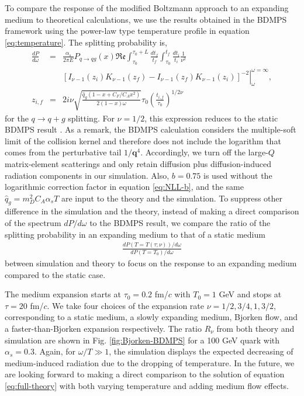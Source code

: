 \documentclass[aps, prc, reprint, amsmath, groupedaddress, nofootinbib]{revtex4-1}
\begin{document}
To compare the response of the modified Boltzmann approach to an expanding medium to theoretical calculations, we use the results obtained in the BDMPS framework \cite{Baier:1998yf} using the power-law type temperature profile in equation \ref{eq:temperature}. 
The splitting probability is,
\begin{eqnarray}
\frac{dP}{d\omega} &=& \frac{\alpha_s}{2\pi E}P_{q\rightarrow qg}(x)\mathfrak{Re}\int_{\tau_0}^{\tau_0+L}\frac{dt_f}{t_f}\int_{\tau_0}^{t_f}\frac{dt_i}{t_i} \frac{1}{\nu^2}\\
\nonumber
&& \left.\left[ I_{\nu-1}(z_i)K_{\nu-1}(z_f)-I_{\nu-1}(z_f)K_{\nu-1}(z_i)\right]^{-2}\right|_{\omega}^{\omega=\infty},\\
z_{i,f} &=& 2i\nu \sqrt{\frac{\hat{q}_g(1-x+C_F/C_A x^2)}{2(1-x)\omega}} \tau_0 \left( \frac{t_{i,f}}{\tau_0}\right) ^{1/2\nu}
\end{eqnarray}
for the $q\rightarrow q+g$ splitting.
For $\nu=1/2$, this expression reduces to the static BDMPS result \cite{Baier:1996kr}. 
As a remark, the BDMPS calculation considers the multiple-soft limit of the collision kernel and therefore does not include the logarithm that comes from the perturbative tail $1/\mathbf{q}^4$. 
Accordingly, we turn off the large-$Q$ matrix-element scatterings and only retain diffusion plus diffusion-induced radiation components in our simulation.
Also, $b=0.75$ is used without the logarithmic correction factor in equation \ref{eq:NLL-b}, and the same $\hat{q}_g = m_D^2 C_A\alpha_s T$ are input to the theory and the simulation.
To suppress other difference in the simulation and the theory, instead of making a direct comparison of the spectrum $dP/d\omega$ to the BDMPS result, we compare the ratio of the splitting probability in an expanding medium to that of a static medium
\begin{eqnarray}
\frac{dP(T=T(\tau;\nu))/d\omega}{dP(T=T_0)/d\omega}
\end{eqnarray}
between simulation and theory to focus on the response to an expanding medium compared to the static case.

The medium expansion starts at $\tau_0=0.2$ fm/$c$ with $T_0=1$ GeV and stops at $\tau = 20$ fm/$c$.
We take four choices of the expansion rate $\nu = 1/2, 3/4, 1, 3/2$, corresponding to a static medium, a slowly expanding medium, Bjorken flow, and a faster-than-Bjorken expansion respectively.
The ratio $R_\nu$ from both theory and simulation are shown in Fig. \ref{fig:Bjorken-BDMPS} for a 100 GeV quark with $\alpha_s=0.3$.
Again, for $\omega/T \gg 1$, the simulation displays the expected decreasing of medium-induced radiation due to the dropping of temperature.
In the future, we are looking forward to making a direct comparison to the solution of equation \ref{eq:full-theory} with both varying temperature and adding medium flow effects.
\end{document}
